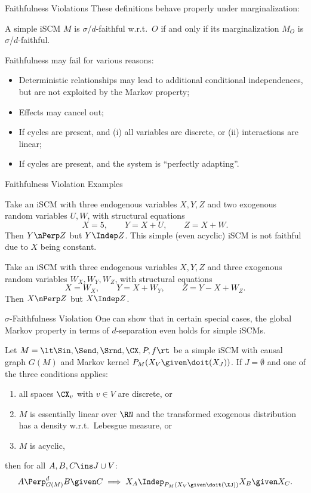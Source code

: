 \begin{frame}{Faithfulness Violations}
These definitions behave properly under marginalization:
\begin{Rem}
A simple iSCM $M$ is $\sigma$/$d$-faithful w.r.t.\ $O$ if and only if
its marginalization $M_O$ is $\sigma$/$d$-faithful.
\end{Rem}

\bigskip
Faithfulness may fail for various reasons:
\begin{itemize}
  \item Deterministic relationships may lead to additional conditional independences, but are not exploited by the Markov property;
  \item Effects may cancel out;
  \item If cycles are present, and (i) all variables are discrete, or (ii) interactions are linear;
  \item If cycles are present, and the system is ``perfectly adapting''.
\end{itemize}
\end{frame}

\begin{frame}{Faithfulness Violation Examples}
\begin{Eg}[Determinism]
  Take an iSCM with three endogenous variables $X,Y,Z$ and two exogenous random variables $U,W$, with structural equations
  $$X = 5, \qquad Y = X + U, \qquad Z = X + W.$$
  Then $Y \nPerp Z$ but $Y \Indep Z$.
  This simple (even acyclic) iSCM is not faithful due to $X$ being constant.
\end{Eg}

\begin{Eg}
  Take an iSCM with three endogenous variables $X,Y,Z$ and three exogenous random variables $W_X,W_Y,W_Z$, with structural equations
  $$X = W_X, \qquad Y = X + W_Y, \qquad Z = Y - X + W_Z.$$
  Then $X \nPerp Z$ but $X \Indep Z$.
\end{Eg}
\end{frame}

\begin{frame}{$\sigma$-Faithfulness Violation}
One can show that in certain special cases, the global Markov property in terms of $d$-separation even holds for simple iSCMs.
\begin{Prp}[\ref{prp:when_d-separation_holds}]
  Let $M = \lt \Sin, \Send, \Srnd, \CX, P, f \rt$ be a simple iSCM with causal graph $G(M)$ and Markov kernel $P_{M}(X_V \given \doit(X_J))$.
  If $J = \emptyset$ and one of the three conditions applies:
  \begin{enumerate}
    \item all spaces $\CX_v$ with $v \in V$ are discrete, or
    \item $M$ is essentially linear over $\RN$ and the transformed exogenous distribution has a density w.r.t.\ Lebesgue measure, or
    \item $M$ is acyclic,
  \end{enumerate} 
  then for all $A, B, C \ins J \cup V$:
  $$A \Perp^d_{G(M)} B \given C \implies X_A \Indep_{P_{M}(X_V \given \doit(\XJ))} X_B \given X_C.$$
\end{Prp}
\end{frame}



